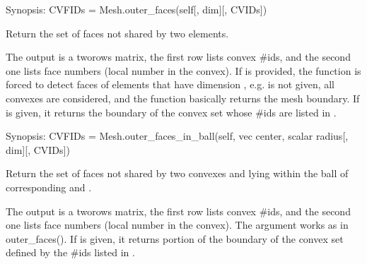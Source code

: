 \documentclass[a4paper,11pt,english]{sphinxmanual}
\begin{document}
\begin{fulllineitems}
\begin{fulllineitems}
\label{\detokenize{python/cmdref_Mesh:getfem.Mesh.outer_faces}}
Synopsis: CVFIDs = Mesh.outer\_faces(self{[}, dim{]}{[}, CVIDs{]})

Return the set of faces not shared by two elements.

The output  is a two\sphinxhyphen{}rows matrix, the first row lists
convex \#ids, and the second one lists face numbers (local number
in the convex). If  is provided, the function is forced to
detect faces of elements that have dimension , e.g.  is not given, all convexes are considered, and the
function basically returns the mesh boundary. If 
is given, it returns the boundary of the convex set whose \#ids are
listed in .

\end{fulllineitems}


\begin{fulllineitems}
\label{\detokenize{python/cmdref_Mesh:getfem.Mesh.outer_faces_in_ball}}
Synopsis: CVFIDs = Mesh.outer\_faces\_in\_ball(self, vec center, scalar radius{[}, dim{]}{[}, CVIDs{]})

Return the set of faces not shared by two convexes and lying within the ball of corresponding  and .

The output  is a two\sphinxhyphen{}rows matrix, the first row lists convex
\#ids, and the second one lists face numbers (local number in the
convex). The argument  works as in outer\_faces().
If  is given, it returns portion of the boundary of
the convex set defined by the \#ids listed in .


\end{fulllineitems}
\end{fulllineitems}
\end{document}
